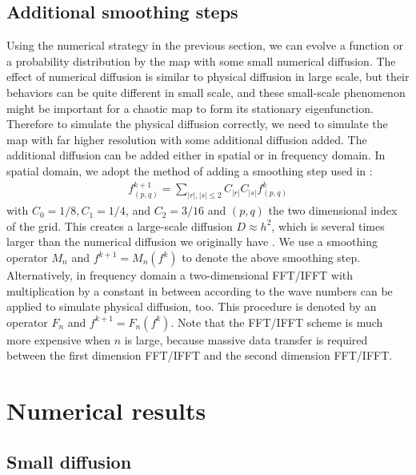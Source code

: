 \subsection{Additional smoothing steps}
Using the numerical strategy in the previous section, we can evolve a function or a probability
distribution by the map with some small numerical diffusion. The effect of numerical diffusion is
similar to physical diffusion in large scale, but their behaviors can be quite different in 
small scale, and these small-scale phenomenon might be important for a chaotic map to form its
stationary eigenfunction. Therefore to simulate the physical diffusion correctly, we need to
simulate the map with far higher resolution with some additional diffusion added. The additional
diffusion can be added either in spatial or in frequency domain. In spatial domain, we adopt
the method of adding a smoothing step used in \cite{Tsang2005}:
 \begin{eqnarray}
 \label{smoothingstep}
   f^{k+1}_{(p,q)} = \sum_{|r|,|s|\le 2}C_{|r|}C_{|s|}f^{k}_{(p,q)}
 \end{eqnarray}
with $C_0=1/8, C_1=1/4$, and $C_2=3/16$ and $(p,q)$ the two dimensional index of the grid. This creates a large-scale diffusion $D \approx h^2$, which is several times larger than the numerical diffusion we originally have \cite{Tsang2005}. We use a smoothing operator $M_n$ and $f^{k+1} = M_n(f^{k})$ to denote the above smoothing step. Alternatively, in frequency domain a two-dimensional FFT/IFFT with multiplication by a constant in between according to the wave numbers can be applied to simulate physical diffusion, too. This procedure is denoted by an operator $F_n$ and $f^{k+1} = F_n(f^{k})$. Note that the FFT/IFFT scheme is much more expensive when $n$ is large, because massive data transfer is required between the first dimension FFT/IFFT and the second dimension FFT/IFFT.


\section{Numerical results}
\label{sec:numresults}

\subsection{Small diffusion}

